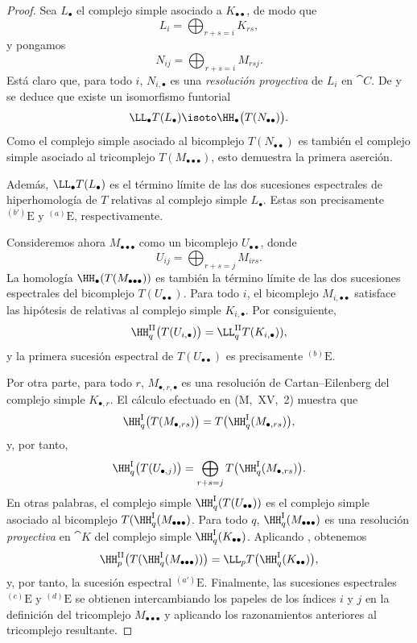 \documentclass[oneside]{amsart}
\begin{document}
\begin{proof}
Sea $L_\bullet$ el complejo simple asociado a
$K_{\bullet\bullet}$, de modo que
\[
  L_i=\bigoplus_{r+s=i}K_{rs},
\]
y pongamos
\[
  N_{ij}=\bigoplus_{r+s=i}M_{rsj}.
\]
Está claro que, para todo $i$, $N_{i,\bullet}$ es una \emph{resolución proyectiva}
de $L_i$ en $\cat{C}$.
De  y  se deduce que existe un
isomorfismo funtorial
\[
  \LL_\bullet T(L_\bullet)
  \isoto
  \HH_\bullet\bigl(T(N_{\bullet\bullet})\bigr).
\]
Como el complejo simple asociado al bicomplejo
$T(N_{\bullet\bullet})$ es también el complejo simple asociado al
tricomplejo $T(M_{\bullet\bullet\bullet})$, esto demuestra la primera aserción.

Además, $\LL_\bullet T(L_\bullet)$ es el término límite de las dos
sucesiones espectrales de hiperhomología  de $T$ relativas al
complejo simple $L_\bullet$.
Estas son precisamente ${}^{(b')}\mathrm{E}$ y ${}^{(a)}\mathrm{E}$,
respectivamente.

Consideremos ahora $M_{\bullet\bullet\bullet}$ como un bicomplejo
$U_{\bullet\bullet}$, donde
\[
  U_{ij}=\bigoplus_{r+s=j}M_{irs}.
\]
La homología $\HH_\bullet(T(M_{\bullet\bullet\bullet}))$ es también la
término límite de las dos sucesiones espectrales del bicomplejo
$T(U_{\bullet\bullet})$.
Para todo $i$, el bicomplejo $M_{i,\bullet\bullet}$ satisface las
hipótesis de  relativas al complejo simple
$K_{i,\bullet}$.
Por consiguiente,
\[
  \HH^{\mathrm{II}}_q\bigl(T(U_{i,\bullet})\bigr)
  =
  \LL^{\mathrm{II}}_qT(K_{i,\bullet})),
\]
y la primera sucesión espectral de $T(U_{\bullet\bullet})$ es precisamente
${}^{(b)}\mathrm{E}$.

Por otra parte, para todo $r$, $M_{\bullet,r,\bullet}$ es una
resolución de Cartan--Eilenberg del complejo simple $K_{\bullet,r}$.
El cálculo efectuado en (M,~XV,~2) muestra que
\[
  \HH^{\mathrm{I}}_q\bigl(T(M_{\bullet,rs})\bigr)
  =
  T\bigl(\HH^{\mathrm{I}}_q(M_{\bullet,rs})\bigr),
\]
y, por tanto,
\[
  \HH^{\mathrm{I}}_q\bigl(T(U_{\bullet,j})\bigr)
  =
  \bigoplus_{r+s=j}
  T\bigl(\HH^{\mathrm{I}}_q(M_{\bullet,rs})\bigr).
\]
En otras palabras, el complejo simple
$\HH^{\mathrm{I}}_q(T(U_{\bullet\bullet}))$ es el complejo simple
asociado al bicomplejo
$T(\HH^{\mathrm{I}}_q(M_{\bullet\bullet\bullet})$.
Para todo $q$, $\HH^{\mathrm{I}}_q(M_{\bullet\bullet\bullet})$ es una
resolución \emph{proyectiva} en $\cat{K}$ del complejo simple
$\HH^{\mathrm{I}}_q(K_{\bullet\bullet})$.
Aplicando , obtenemos
\[
  \HH^{\mathrm{II}}_p
  \bigl(T(\HH^{\mathrm{I}}_q(M_{\bullet\bullet\bullet}))\bigr)
  =
  \LL_pT\bigl(\HH^{\mathrm{I}}_q(K_{\bullet\bullet})\bigr),
\]
y, por tanto, la sucesión espectral ${}^{(a')}\mathrm{E}$.
Finalmente, las sucesiones espectrales ${}^{(c)}\mathrm{E}$ y
${}^{(d)}\mathrm{E}$ se obtienen intercambiando los papeles de los
índices $i$ y $j$ en la definición del tricomplejo
$M_{\bullet\bullet\bullet}$ y aplicando los razonamientos anteriores al
tricomplejo resultante.
\end{proof}
\end{document}
